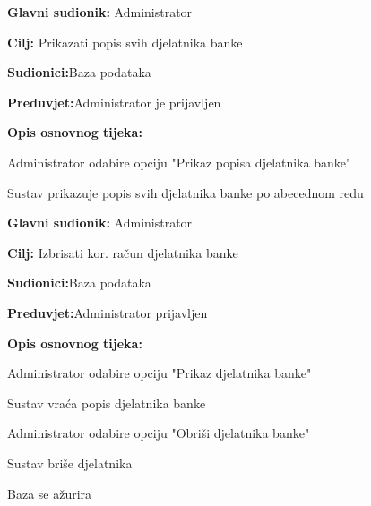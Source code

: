 \eject
\noindent {}
\begin{packed_item}
	
	\item \textbf{Glavni sudionik: }{Administrator}
	\item  \textbf{Cilj:} {Prikazati popis svih djelatnika banke}
	\item  \textbf{Sudionici:}{Baza podataka} 
	\item  \textbf{Preduvjet:}{Administrator je prijavljen}
	\item  \textbf{Opis osnovnog tijeka:}
	
	\item[] \begin{packed_enum}
		
		\item {Administrator odabire opciju "Prikaz popisa djelatnika banke"}
		\item {Sustav prikazuje popis svih djelatnika banke po abecednom redu}
		\end{packed_enum}
\end{packed_item}

\noindent {}
\begin{packed_item}
	\item \textbf{Glavni sudionik: }{Administrator}
	\item  \textbf{Cilj:} {Izbrisati kor. račun djelatnika banke}
	\item  \textbf{Sudionici:}{Baza podataka}
	\item  \textbf{Preduvjet:}{Administrator prijavljen}
	\item  \textbf{Opis osnovnog tijeka:}
	
	\item[] \begin{packed_enum}
		
		\item {Administrator odabire opciju "Prikaz djelatnika banke"}
		\item {Sustav vraća popis djelatnika banke}
		\item {Administrator odabire opciju "Obriši djelatnika banke"}
		\item {Sustav briše djelatnika}
		\item {Baza se ažurira}
	\end{packed_enum}
	
\end{packed_item}

